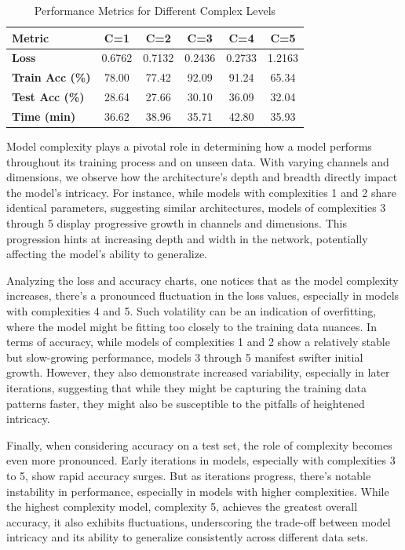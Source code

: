 \documentclass[10pt,twocolumn,letterpaper]{article}
\begin{document}
\begin{table}[h!]
   \centering
   \footnotesize
   \begin{tabular}{lccccc}
      \hline
      \textbf{Metric}         & \textbf{C=1} & \textbf{C=2} & \textbf{C=3} & \textbf{C=4} & \textbf{C=5} \\ \hline
      \textbf{Loss}           & 0.6762       & 0.7132       & 0.2436       & 0.2733       & 1.2163       \\
      \textbf{Train Acc (\%)} & 78.00        & 77.42        & 92.09        & 91.24        & 65.34        \\
      \textbf{Test Acc (\%)}  & 28.64        & 27.66        & 30.10        & 36.09        & 32.04        \\
      \textbf{Time (min)}     & 36.62        & 38.96        & 35.71        & 42.80        & 35.93        \\ \hline
   \end{tabular}
   \caption{Performance Metrics for Different Complex Levels}
   \label{tab:complex_level_performance_transposed}
\end{table}


Model complexity plays a pivotal role in determining how a model performs throughout its training process and on unseen data. With varying channels and dimensions, we observe how the architecture's depth and breadth directly impact the model's intricacy. For instance, while models with complexities 1 and 2 share identical parameters, suggesting similar architectures, models of complexities 3 through 5 display progressive growth in channels and dimensions. This progression hints at increasing depth and width in the network, potentially affecting the model's ability to generalize.

Analyzing the loss and accuracy charts, one notices that as the model complexity increases, there's a pronounced fluctuation in the loss values, especially in models with complexities 4 and 5. Such volatility can be an indication of overfitting, where the model might be fitting too closely to the training data nuances. In terms of accuracy, while models of complexities 1 and 2 show a relatively stable but slow-growing performance, models 3 through 5 manifest swifter initial growth. However, they also demonstrate increased variability, especially in later iterations, suggesting that while they might be capturing the training data patterns faster, they might also be susceptible to the pitfalls of heightened intricacy.

Finally, when considering accuracy on a test set, the role of complexity becomes even more pronounced. Early iterations in models, especially with complexities 3 to 5, show rapid accuracy surges. But as iterations progress, there's notable instability in performance, especially in models with higher complexities. While the highest complexity model, complexity 5, achieves the greatest overall accuracy, it also exhibits fluctuations, underscoring the trade-off between model intricacy and its ability to generalize consistently across different data sets.
\end{document}
